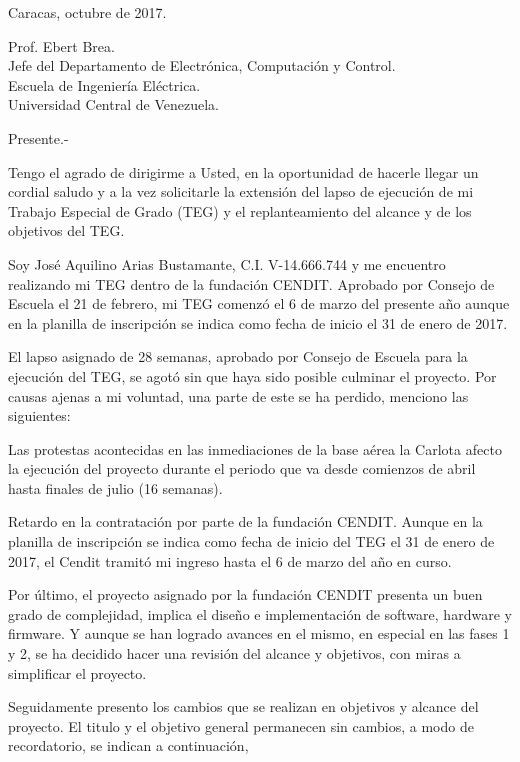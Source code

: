 \documentclass[paper=letter,oneside,fontsize=12pt, parskip=full]{article}
\begin{document}
	\begin{flushright}		
		\large
		Caracas, octubre de 2017. \\	
	\end{flushright}

	
	\begin{onehalfspace}
		\large
		Prof. Ebert Brea. \\
		Jefe del Departamento de Electrónica, Computación y Control. \\
		Escuela de Ingeniería Eléctrica. \\
		Universidad Central de Venezuela.	
	\end{onehalfspace}

	Presente.- 
	
	Tengo el agrado de dirigirme a Usted, en la oportunidad de hacerle llegar un cordial saludo y a la vez solicitarle la extensión del lapso de ejecución de mi Trabajo Especial de Grado (TEG) y el replanteamiento del alcance y de los objetivos del TEG.
	 
	Soy José Aquilino Arias Bustamante, C.I. V-14.666.744 y me encuentro realizando mi TEG dentro de la fundación CENDIT. Aprobado por Consejo de Escuela el 21 de febrero, mi TEG comenzó el 6 de marzo del presente año aunque en la planilla de inscripción se indica como fecha de inicio el 31 de enero de 2017.
	
	El lapso asignado de 28 semanas, aprobado por Consejo de Escuela para la ejecución del TEG, se agotó sin que haya sido posible culminar el proyecto. Por causas ajenas a mi voluntad,  
	una parte de este se ha perdido, menciono las siguientes:
	
	Las protestas acontecidas en las inmediaciones de la base aérea la Carlota afecto la ejecución del proyecto durante el periodo que va desde comienzos de abril hasta finales de julio (16 semanas).
	
	Retardo en la contratación por parte de la fundación CENDIT. Aunque en la planilla de inscripción se indica como fecha de inicio del TEG el 31 de enero de 2017, el Cendit tramitó mi ingreso hasta el 6 de marzo del año en curso. 
	
	Por último, el proyecto asignado por la fundación CENDIT presenta un buen grado de complejidad, implica el diseño e implementación de software, hardware y firmware. Y aunque se han logrado avances en el mismo, en especial en las fases 1 y 2, se ha decidido hacer una revisión del alcance y objetivos, con miras a simplificar el proyecto. 
	
	Seguidamente presento los cambios que se realizan en objetivos y alcance del proyecto. El titulo y el objetivo general permanecen sin cambios, a modo de recordatorio, se indican a continuación,
	
\end{document}
